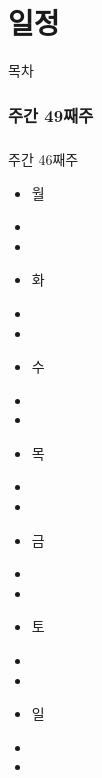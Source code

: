 \documentclass[aspectratio=1610,20pt,xcolor=pdftex,dvipsnames,table,handout]{beamer}
\begin{document}
		\part{일정}
		\frame{\partpage}
		
\label{part2} 	%

		\begin{frame} [plain]{목차}
		\tableofcontents%
		\end{frame}

		\section{주간 
				49째주 }

		\begin{frame} [t,plain]
		\frametitle{}
			\begin{block} {주간 46째주 }
			\setlength{\leftmargini}{1em}			
			\begin{itemize}
				\item 월	\hrulefill
				\item \hrulefill
				\item \hrulefill
				\item 화 \hrulefill
				\item \hrulefill
				\item \hrulefill
				\item 수 \hrulefill
				\item \hrulefill
				\item \hrulefill
				\item 목 \hrulefill
				\item \hrulefill
				\item \hrulefill
				\item 금 \hrulefill
				\item \hrulefill
				\item \hrulefill
				\item 토 \hrulefill
				\item \hrulefill
				\item \hrulefill
				\item 일 \hrulefill
				\item \hrulefill
				\item \hrulefill
			\end{itemize}
			\end{block}			
								
		\end{frame}						
		
\end{document}
